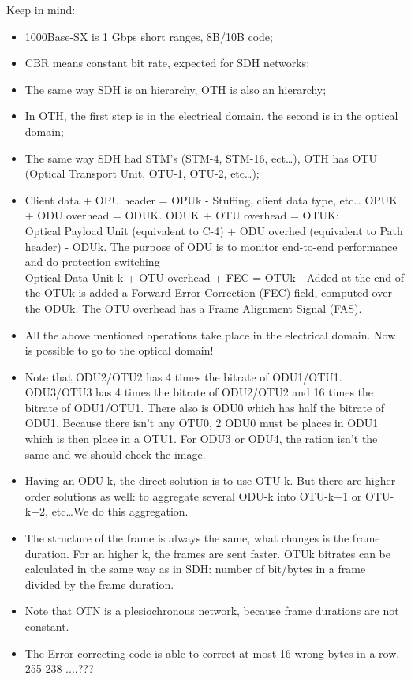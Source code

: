 Keep in mind:
\begin{itemize}
    \item 1000Base-SX is 1 Gbps short ranges, 8B/10B code;
    \item CBR means constant bit rate, expected for SDH networks;
    \item The same way SDH is an hierarchy, OTH is also an hierarchy;
    \item In OTH, the first step is in the electrical domain, the second is in the optical domain;
    \item The same way SDH had STM's (STM-4, STM-16, ect\dots), OTH has OTU (Optical Transport Unit, OTU-1, OTU-2, etc\dots);
    \item Client data + OPU header = OPUk - Stuffing, client data type, etc\dots
    OPUK + ODU overhead = ODUK. ODUK + OTU overhead = OTUK:\\
    Optical Payload Unit (equivalent to C-4)  + ODU overhed (equivalent to Path header) - ODUk. The purpose of ODU is to monitor end-to-end performance and do protection switching\\
    Optical Data Unit k + OTU overhead + FEC =  OTUk - Added at the end of the OTUk is added a Forward Error Correction (FEC) field, computed over the ODUk. The OTU overhead has a Frame Alignment Signal (FAS).
    \item All the above mentioned operations take place in the electrical domain. Now is possible to go to the optical domain!
    \item Note that ODU2/OTU2 has 4 times the bitrate of ODU1/OTU1. ODU3/OTU3 has 4 times the bitrate of ODU2/OTU2 and 16 times the bitrate of ODU1/OTU1. There also is ODU0 which has half the bitrate of ODU1. Because there isn't any OTU0, 2 ODU0 must be places in ODU1 which is then place in a OTU1. For ODU3 or ODU4, the ration isn't the same and we should check the image. 
    \item Having an ODU-k, the direct solution is to use OTU-k. But there are higher order solutions as well: to aggregate several ODU-k into OTU-k+1 or OTU-k+2, etc\dots We do this aggregation.
    \item The structure of the frame is always the same, what changes is the frame duration. For an higher k, the frames are sent faster.
    OTUk bitrates can be calculated in the same way as in SDH: number of bit/bytes in a frame divided by the frame duration.
    \item Note that OTN is a plesiochronous network, because frame durations are not constant. 
    \item The Error correcting code is able to correct at most 16 wrong bytes in a row. 255-238 ....???
\end{itemize}







